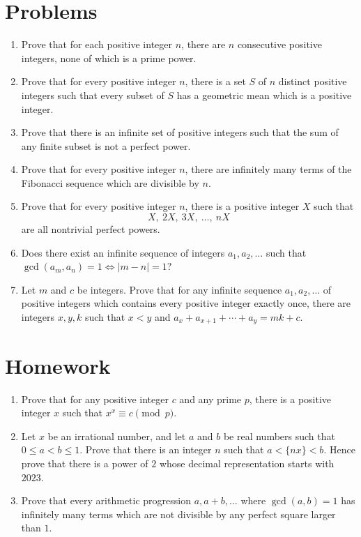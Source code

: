 \documentclass{article}
\begin{document}
\section{Problems}
\begin{enumerate}
  \item Prove that for each positive integer $n$, there are $n$ consecutive
    positive integers, none of which is a prime power.
  \item Prove that for every positive integer $n$, there is a set $S$ of $n$
    distinct positive integers such that every subset of $S$ has a geometric
    mean which is a positive integer.
  \item Prove that there is an infinite set of positive integers such that the
    sum of any finite subset is not a perfect power.
  \item Prove that for every positive integer $n$, there are infinitely many
    terms of the Fibonacci sequence which are divisible by $n$.
  \item Prove that for every positive integer $n$, there is a positive integer
    $X$ such that \[X,\ 2X,\ 3X,\ \ldots,\ nX\] are all nontrivial perfect powers.
  \item Does there exist an infinite sequence of integers $a_1,a_2,\ldots$ such
    that $\gcd(a_m,a_n)=1\iff |m-n|=1$?
  \item Let $m$ and $c$ be integers.
    Prove that for any infinite sequence $a_1,a_2,\ldots$ of positive integers which
    contains every positive integer exactly once, there
    are integers $x,y,k$ such that $x<y$ and $a_x+a_{x+1}+\cdots+a_y=mk+c$.
\end{enumerate}
\newpage
\section{Homework}
\begin{enumerate}
  \item Prove that for any positive integer $c$ and any prime $p$, there is a
    positive integer $x$ such that $x^x\equiv c\pmod p$.
  \item Let $x$ be an irrational number, and let $a$ and $b$ be real numbers
    such that $0\le a<b\le 1$. Prove that there is an integer $n$ such that
    $a<\{nx\}<b$. Hence prove that there is a power of $2$ whose decimal
    representation starts with $2023$.
  \item Prove that every arithmetic progression $a,a+b,\ldots$ where
    $\gcd(a,b)=1$ has infinitely many terms which are not divisible by any
    perfect square larger than $1$.
\end{enumerate}
\end{document}
